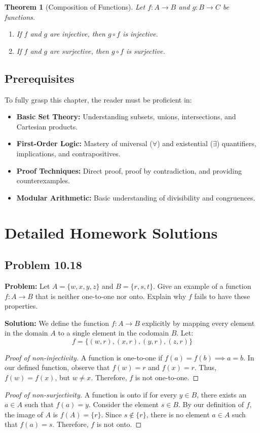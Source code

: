 \documentclass[11pt, a4paper]{article}
\newtheorem{theorem}{Theorem}[section]
\theoremstyle{definition}
\theoremstyle{remark}
\begin{document}
\begin{theorem}[Composition of Functions]
Let $f: A \to B$ and $g: B \to C$ be functions.
\begin{enumerate}
    \item If $f$ and $g$ are injective, then $g \circ f$ is injective.
    \item If $f$ and $g$ are surjective, then $g \circ f$ is surjective.
\end{enumerate}
\end{theorem}

\subsection{Prerequisites}
To fully grasp this chapter, the reader must be proficient in:
\begin{itemize}
    \item \textbf{Basic Set Theory:} Understanding subsets, unions, intersections, and Cartesian products.
    \item \textbf{First-Order Logic:} Mastery of universal ($\forall$) and existential ($\exists$) quantifiers, implications, and contrapositives.
    \item \textbf{Proof Techniques:} Direct proof, proof by contradiction, and providing counterexamples.
    \item \textbf{Modular Arithmetic:} Basic understanding of divisibility and congruences.
\end{itemize}

\newpage
\section{Detailed Homework Solutions}

\subsection{Problem 10.18}
\textbf{Problem:} Let $A = \{w, x, y, z\}$ and $B = \{r, s, t\}$. Give an example of a function $f : A \to B$ that is neither one-to-one nor onto. Explain why $f$ fails to have these properties.

\textbf{Solution:}
We define the function $f: A \to B$ explicitly by mapping every element in the domain $A$ to a single element in the codomain $B$. Let:
\[ f = \{(w, r), (x, r), (y, r), (z, r)\} \]
\begin{proof}[Proof of non-injectivity]
A function is one-to-one if $f(a) = f(b) \implies a = b$. In our defined function, observe that $f(w) = r$ and $f(x) = r$. Thus, $f(w) = f(x)$, but $w \neq x$. Therefore, $f$ is not one-to-one.
\end{proof}
\begin{proof}[Proof of non-surjectivity]
A function is onto if for every $y \in B$, there exists an $a \in A$ such that $f(a) = y$. Consider the element $s \in B$. By our definition of $f$, the image of $A$ is $f(A) = \{r\}$. Since $s \notin \{r\}$, there is no element $a \in A$ such that $f(a) = s$. Therefore, $f$ is not onto.
\end{proof}
\end{document}
